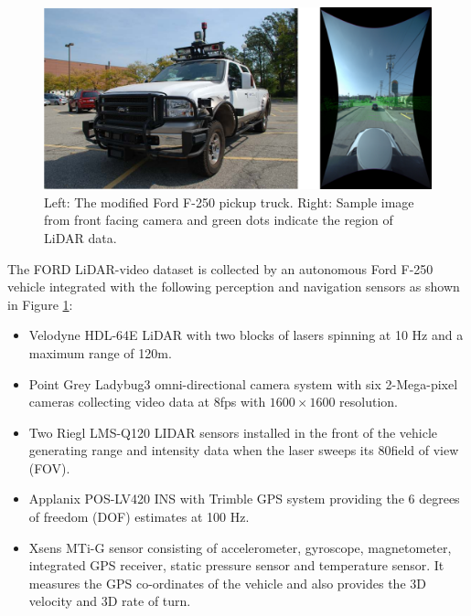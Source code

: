 \documentclass{article}
\begin{document}
\begin{figure}[htbp]
    \centering
        \includegraphics[scale=0.45]{Figures/ford_truck_sensor.pdf}
    \caption{Left: The modified Ford F-250 pickup truck. Right: Sample image from front facing camera and green dots indicate the region of LiDAR data.}
    \label{fig:ford-truck-sensors}
\end{figure}

The FORD LiDAR-video dataset \cite{Pandey2011Ford-Campu} is collected by an autonomous Ford F-250 vehicle integrated with the following perception and navigation sensors as shown in Figure \ref{fig:ford-truck-sensors}:
\begin{itemize}
    \item Velodyne HDL-64E LiDAR with two blocks of lasers spinning at 10 Hz and a maximum range of 120m.
    \item Point Grey Ladybug3 omni-directional camera system with six 2-Mega-pixel cameras collecting video data at 8fps with $1600\times1600$ resolution.
    \item Two Riegl LMS-Q120 LIDAR sensors installed in the front of the vehicle generating range and intensity data when the laser sweeps its 80\degree field of view (FOV).
    \item Applanix POS-LV420 INS with Trimble GPS system providing the 6 degrees of freedom (DOF) estimates at 100 Hz.
    \item Xsens MTi-G sensor consisting of accelerometer, gyroscope, magnetometer, integrated GPS receiver, static pressure sensor and temperature sensor. It measures the GPS co-ordinates of the vehicle and also provides the 3D velocity and 3D rate of turn.
\end{itemize}
\end{document}

